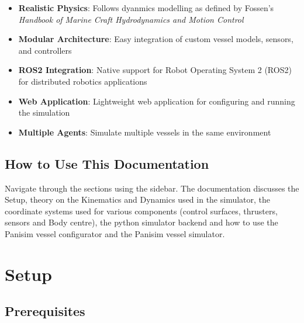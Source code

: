 \documentclass[
  letterpaper,
  DIV=11,
  numbers=noendperiod]{scrreprt}
\providecommand{\tightlist}{%
  \setlength{\itemsep}{0pt}\setlength{\parskip}{0pt}}\usepackage{longtable,booktabs,array}
\begin{document}

\begin{itemize}
\tightlist
\item
  \textbf{Realistic Physics}: Follows dyanmics modelling as defined by
  Fossen's
  \textit{Handbook of Marine Craft Hydrodynamics and Motion Control}
\item
  \textbf{Modular Architecture}: Easy integration of custom vessel
  models, sensors, and controllers
\item
  \textbf{ROS2 Integration}: Native support for Robot Operating System 2
  (ROS2) for distributed robotics applications
\item
  \textbf{Web Application}: Lightweight web application for configuring
  and running the simulation
\item
  \textbf{Multiple Agents}: Simulate multiple vessels in the same
  environment
\end{itemize}

\section*{How to Use This
Documentation}\label{how-to-use-this-documentation}


Navigate through the sections using the sidebar. The documentation
discusses the Setup, theory on the Kinematics and Dynamics used in the
simulator, the coordinate systems used for various components (control
surfaces, thrusters, sensors and Body centre), the python simulator
backend and how to use the Panisim vessel configurator and the Panisim
vessel simulator.


\chapter*{Setup}\label{setup}


\section*{Prerequisites}\label{prerequisites}

\end{document}
